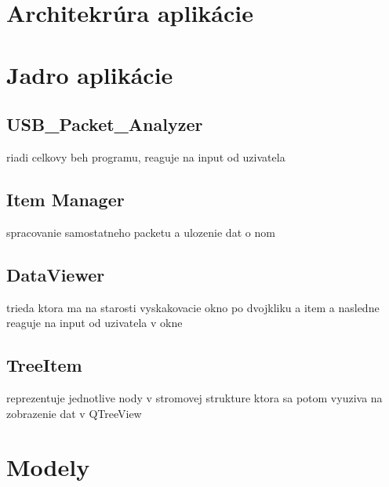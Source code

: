 


























\newpage
\section{Architekrúra aplikácie}
\section{Jadro aplikácie}
\subsection{USB\_Packet\_Analyzer}
riadi celkovy beh programu, reaguje na input od uzivatela
\subsection{Item Manager}
spracovanie samostatneho packetu a ulozenie dat o nom
\subsection{DataViewer}
trieda ktora ma na starosti vyskakovacie okno po dvojkliku a item a nasledne reaguje na input od uzivatela v okne
\subsection{TreeItem}
reprezentuje jednotlive nody v stromovej strukture ktora sa potom vyuziva na zobrazenie dat v QTreeView
\section{Modely}
